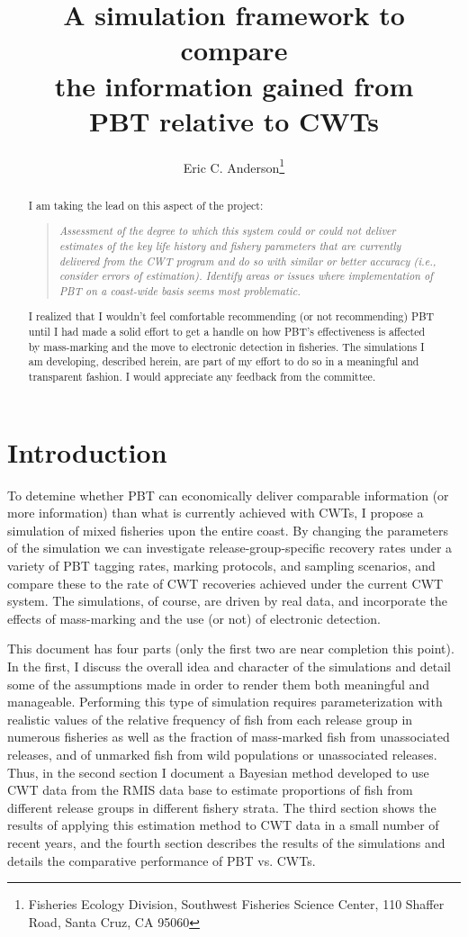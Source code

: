 \documentclass[11pt]{article}
\title{A simulation framework to compare \\
the information gained from \\
PBT relative to CWTs}
\author{Eric C. Anderson\thanks{
    Fisheries Ecology Division, 
    Southwest Fisheries Science Center, 
    110 Shaffer Road,
    Santa Cruz, CA 95060}
}
\begin{document}
\maketitle

\begin{abstract}
\noindent I am taking the lead on this aspect of the project:
\begin{quote}
{\sl Assessment of the degree to which this system could or could not deliver estimates of the key life history and fishery parameters that are currently delivered from the CWT program and do so with similar or better accuracy (i.e., consider errors of estimation). Identify areas or issues where implementation of PBT on a coast-wide basis seems most problematic. }
\end{quote}
I realized that I wouldn't feel comfortable recommending (or not recommending) PBT until I had made
a solid effort to get a handle on how PBT's effectiveness is affected by mass-marking and the move to
electronic detection in fisheries.  The simulations I am developing, described herein, are part of
my effort to do so in a meaningful and transparent fashion.  I would appreciate any feedback from the
committee.
\end{abstract}


\section{Introduction}

To detemine whether PBT can economically 
deliver comparable information (or more information) than what is currently achieved with CWTs,
I propose a simulation of
mixed fisheries upon the entire coast.  By changing the parameters of the
simulation we can investigate release-group-specific recovery rates
under a variety of PBT tagging rates, marking protocols, and sampling scenarios, and compare these
to the rate of CWT recoveries achieved under the current CWT system.
The simulations, of course, are driven by real data, and incorporate the effects of mass-marking and the use
(or not) of electronic detection.

This document has four parts (only the first two are near completion this point).
In the first, I discuss the overall idea and character of the simulations
and detail some of the assumptions made in order to render them both meaningful and manageable.  
Performing this type of simulation
requires parameterization with realistic values of the  relative frequency of fish from each release group
in numerous fisheries as well as the fraction of mass-marked fish from unassociated releases, and 
of unmarked fish from wild populations or unassociated releases. Thus, in the second section I document
a Bayesian method developed to use CWT data from the RMIS data base to estimate proportions of fish from
different release groups in different fishery strata.  The third section shows the results of applying this
estimation method to CWT data in a small number of recent years, and the fourth section describes the results
of the simulations and details the comparative performance of PBT vs. CWTs.
\end{document}

